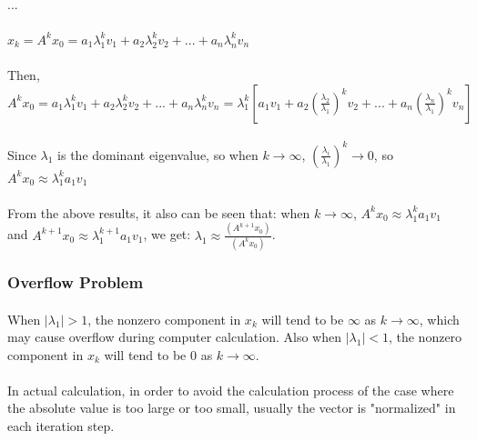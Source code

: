 \documentclass[12pt]{article}
\begin{document}
\paragraph{}...
\paragraph{}$x_k =A^kx_0 = a_1\lambda_1^kv_1 + a_2\lambda_2^kv_2+...+a_n\lambda_n^kv_n$

\paragraph{}Then, $A^kx_0 = a_1\lambda_1^kv_1 + a_2\lambda_2^kv_2+...+a_n\lambda_n^kv_n = \lambda_1^k[a_1v_1+a_2(\frac{\lambda_2}{\lambda_1})^kv_2+...+a_n(\frac{\lambda_n}{\lambda_1})^kv_n]$

\paragraph{}Since $\lambda_1$ is the dominant eigenvalue, so when $k\rightarrow\infty$, $(\frac{\lambda_i}{\lambda_1})^k\rightarrow0$, so $A^kx_0 \approx \lambda_1^ka_1v_1$

\paragraph{}From the above results, it also can be seen that: when $k\rightarrow\infty$, $A^kx_0 \approx \lambda_1^ka_1v_1$ and $A^{k+1}x_0 \approx \lambda_1^{k+1}a_1v_1$, we get: $\lambda_1 \approx \frac{(A^{k+1}x_0)}{(A^kx_0)}$.


\subsubsection{Overflow Problem}
\paragraph{}When $|\lambda_1| > 1$, the nonzero component in $x_k$ will tend to be $\infty$ as $k\rightarrow\infty$, which may cause overflow during computer calculation. Also when $|\lambda_1| < 1$, the nonzero component in $x_k$ will tend to be $0$ as $k\rightarrow\infty$.
\paragraph{}In actual calculation, in order to avoid the calculation process of the case where the absolute value is too large or too small, usually the vector is "normalized" in each iteration step.
\end{document}
